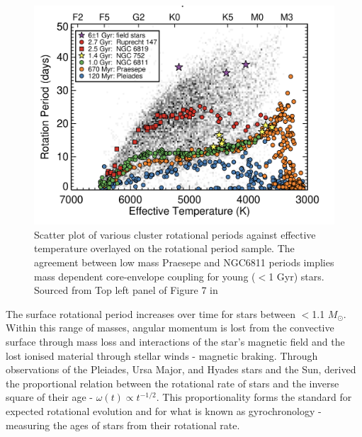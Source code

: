 \begin{figure}[h]
    \includegraphics[width=\textwidth]{Figures/intro_figures/cluster_kepler.png}
    \caption{Scatter plot of various cluster rotational periods against effective temperature overlayed on the \kepler{} \citet{mcquillan_rotation_2014} rotational period sample.
    The agreement between low mass Praesepe and NGC6811 periods implies mass dependent core-envelope coupling for young ($<$1 Gyr) stars.
    Sourced from Top left panel of Figure 7 in \citet{curtis_when_2020}}
    \label{fig:cluster_rotational_periods}
\end{figure}

The surface rotational period increases over time for stars between $<$1.1 $M_{\odot}$.
Within this range of masses, angular momentum is lost from the convective surface through mass loss and interactions of the star's magnetic field and the lost ionised material through stellar winds - magnetic braking.
Through observations of the Pleiades, Ursa Major, and Hyades stars and the Sun, \citet{skumanich_time_1972} derived the proportional relation between the rotational rate of stars and the inverse square of their age - $\omega(t) \propto t^{-1/2}$.
This proportionality forms the standard for expected rotational evolution and for what is known as gyrochronology - measuring the ages of stars from their rotational rate.

